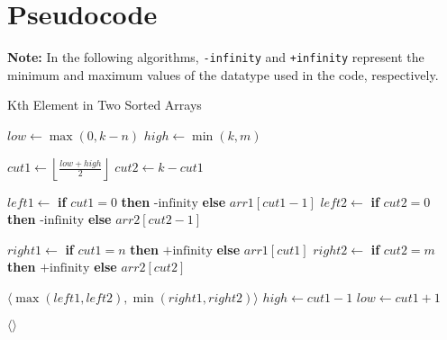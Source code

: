 \documentclass{article}
\begin{document}
\section{Pseudocode}
\textbf{Note:} In the following algorithms, \texttt{-infinity} and \texttt{+infinity} represent the minimum and maximum values of the datatype used in the code, respectively.
\begin{algorithm}
\caption{Kth Element in Two Sorted Arrays}
\begin{algorithmic}[1]
            \State \Return {}
        \EndIf
        
        \State $low \gets \max(0, k - n)$
        \State $high \gets \min(k, m)$

            \State $cut1 \gets \left\lfloor\frac{low + high}{2}\right\rfloor$
            \State $cut2 \gets k - cut1$

            \State $left1 \gets$ \textbf{if} $cut1 = 0$ \textbf{then} $\text{-infinity}$ \textbf{else} $arr1[cut1 - 1]$
            \State $left2 \gets$ \textbf{if} $cut2 = 0$ \textbf{then} $\text{-infinity}$ \textbf{else} $arr2[cut2 - 1]$
            
            \State $right1 \gets$ \textbf{if} $cut1 = n$ \textbf{then} $\text{+infinity}$ \textbf{else} $arr1[cut1]$
            \State $right2 \gets$ \textbf{if} $cut2 = m$ \textbf{then} $\text{+infinity}$ \textbf{else} $arr2[cut2]$

                \State \Return $\langle \max(left1, left2), \min(right1, right2) \rangle$ 
                \State $high \gets cut1 - 1$
            \Else
                \State $low \gets cut1 + 1$
            \EndIf
        \EndWhile

        \State \Return $\langle \rangle$ 
    \EndFunction
\end{algorithmic}
\end{algorithm}
\end{document}
